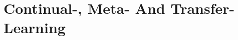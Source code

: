 \documentclass[main]{subfiles}
\begin{document}
\newpage
\section{Continual-, Meta- And Transfer-Learning}
\end{document}

